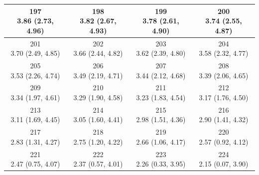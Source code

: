 \begin{table}[htbp]
\begin{tabular}{cccc}
\shortstack[c]{197\\3.86 (2.73, 4.96)} & \shortstack[c]{198\\3.82 (2.67, 4.93)} & \shortstack[c]{199\\3.78 (2.61, 4.90)} & \shortstack[c]{200\\3.74 (2.55, 4.87)} \\
\hline
\shortstack[c]{201\\3.70 (2.49, 4.85)} & \shortstack[c]{202\\3.66 (2.44, 4.82)} & \shortstack[c]{203\\3.62 (2.39, 4.80)} & \shortstack[c]{204\\3.58 (2.32, 4.77)} \\
\hline
\shortstack[c]{205\\3.53 (2.26, 4.74)} & \shortstack[c]{206\\3.49 (2.19, 4.71)} & \shortstack[c]{207\\3.44 (2.12, 4.68)} & \shortstack[c]{208\\3.39 (2.06, 4.65)} \\
\hline
\shortstack[c]{209\\3.34 (1.97, 4.61)} & \shortstack[c]{210\\3.29 (1.90, 4.58)} & \shortstack[c]{211\\3.23 (1.83, 4.54)} & \shortstack[c]{212\\3.17 (1.76, 4.50)} \\
\hline
\shortstack[c]{213\\3.11 (1.69, 4.45)} & \shortstack[c]{214\\3.05 (1.60, 4.41)} & \shortstack[c]{215\\2.98 (1.51, 4.36)} & \shortstack[c]{216\\2.90 (1.41, 4.32)} \\
\hline
\shortstack[c]{217\\2.83 (1.31, 4.27)} & \shortstack[c]{218\\2.75 (1.20, 4.22)} & \shortstack[c]{219\\2.66 (1.06, 4.17)} & \shortstack[c]{220\\2.57 (0.92, 4.12)} \\
\hline
\shortstack[c]{221\\2.47 (0.75, 4.07)} & \shortstack[c]{222\\2.37 (0.57, 4.01)} & \shortstack[c]{223\\2.26 (0.33, 3.95)} & \shortstack[c]{224\\2.15 (0.07, 3.90)} \\
\hline
\end{tabular}
\end{table}